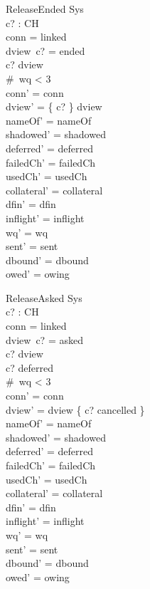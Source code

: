 \documentclass[a4paper,10pt,fleqn]{article}
\begin{document}
\begin{schema}{ReleaseEnded}
  \Delta Sys \\
  c? : CH \\
\where
  conn = linked \\
  dview~c? = ended \\
  c? \in \dom dview \\
  \#~wq < 3 \\
  conn' = conn \\
  dview' = \{ c? \} \ndres dview \\
  nameOf' = nameOf \\
  shadowed' = shadowed \\
  deferred' = deferred \\
  failedCh' = failedCh \\
  usedCh' = usedCh \\
  collateral' = collateral \\
  dfin' = dfin \\
  inflight' = inflight \\
  wq' = wq \\
  sent' = sent \\
  dbound' = dbound \\
  owed' = owing
\end{schema}

\begin{schema}{ReleaseAsked}
  \Delta Sys \\
  c? : CH \\
\where
  conn = linked \\
  dview~c? = asked \\
  c? \in \dom dview \\
  c? \notin deferred \\
  \#~wq < 3 \\
  conn' = conn \\
  dview' = dview \oplus \{ c? \mapsto cancelled \} \\
  nameOf' = nameOf \\
  shadowed' = shadowed \\
  deferred' = deferred \\
  failedCh' = failedCh \\
  usedCh' = usedCh \\
  collateral' = collateral \\
  dfin' = dfin \\
  inflight' = inflight \\
  wq' = wq \\
  sent' = sent \\
  dbound' = dbound \\
  owed' = owing
\end{schema}
\end{document}
